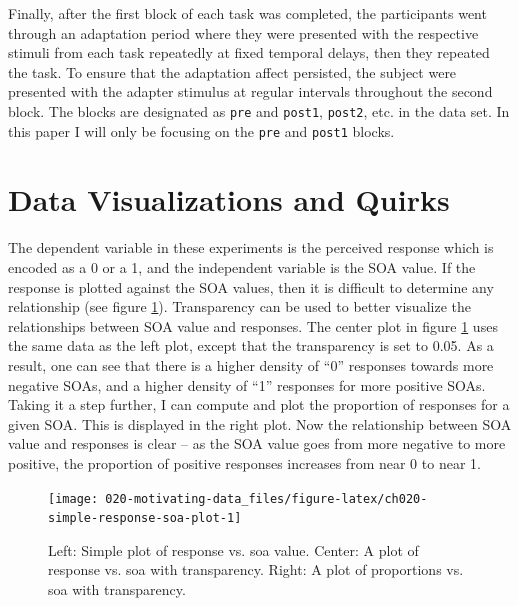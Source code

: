 \documentclass[11pt, oneside, openany]{scrbook}
\begin{document}
Finally, after the first block of each task was completed, the participants went through an adaptation period where they were presented with the respective stimuli from each task repeatedly at fixed temporal delays, then they repeated the task. To ensure that the adaptation affect persisted, the subject were presented with the adapter stimulus at regular intervals throughout the second block. The blocks are designated as \texttt{pre} and \texttt{post1}, \texttt{post2}, etc. in the data set. In this paper I will only be focusing on the \texttt{pre} and \texttt{post1} blocks.

\hypertarget{data-visualizations-and-quirks}{%
\section{Data Visualizations and Quirks}\label{data-visualizations-and-quirks}}

The dependent variable in these experiments is the perceived response which is encoded as a 0 or a 1, and the independent variable is the SOA value. If the response is plotted against the SOA values, then it is difficult to determine any relationship (see figure \ref{fig:ch020-simple-response-soa-plot}). Transparency can be used to better visualize the relationships between SOA value and responses. The center plot in figure \ref{fig:ch020-simple-response-soa-plot} uses the same data as the left plot, except that the transparency is set to 0.05. As a result, one can see that there is a higher density of ``0'' responses towards more negative SOAs, and a higher density of ``1'' responses for more positive SOAs. Taking it a step further, I can compute and plot the proportion of responses for a given SOA. This is displayed in the right plot. Now the relationship between SOA value and responses is clear -- as the SOA value goes from more negative to more positive, the proportion of positive responses increases from near 0 to near 1.

\begin{figure}

{\centering \texttt{[image: 020-motivating-data\_files/figure-latex/ch020-simple-response-soa-plot-1]} 

}

\caption{Left: Simple plot of response vs. soa value. Center: A plot of response vs. soa with transparency. Right: A plot of proportions vs. soa with transparency.}\label{fig:ch020-simple-response-soa-plot}
\end{figure}
\end{document}

